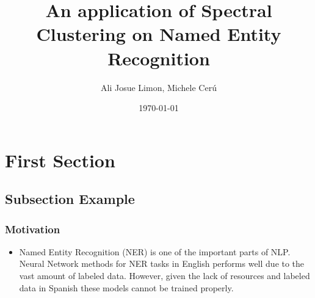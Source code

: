 \documentclass{beamer}
\title[spectral clustering for NER ]{An application of Spectral Clustering on Named Entity Recognition } %
\author{Ali Josue Limon, Michele Cer\'u} %
\institute[NYU] %
{
New York University \\ %
\medskip
\textit{ajl649@nyu.edu; mc3784@nyu.edu} %
}
\date{\today} %
\begin{document}
\begin{frame}
\titlepage %
\end{frame}





\section{First Section} %

\subsection{Subsection Example} %

\begin{frame}
	\frametitle{Motivation}
	\begin{itemize} 
		\item Named Entity Recognition (NER) is one of the important parts of NLP. Neural Network methods for NER tasks in English performs well due to the vast amount of labeled data. However, given the lack of resources and labeled data in Spanish these models cannot be trained properly. 
		
		
	\end{itemize}
\end{frame}
\end{document}
